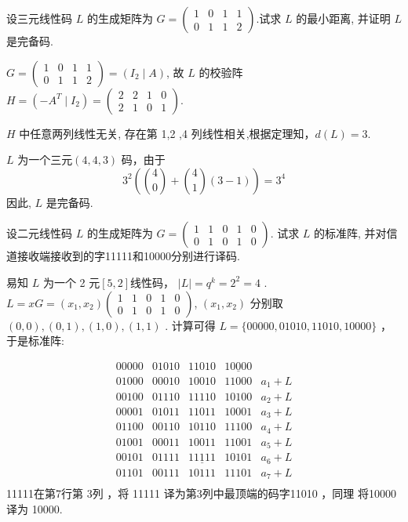 \newpage
 \begin{tcolorbox}[breakable,colback=blue!5!white,colframe=blue!75!black,
 title= 解答题]
设三元线性码 $ L $ 的生成矩阵为
$
G=\left(\begin{array}{llll}
1 & 0 & 1 & 1 \\
0 & 1 & 1 & 2
\end{array}\right)
$.试求 $ L $ 的最小距离, 并证明 $ L $ 是完备码.

\tcblower
 $ G=\left(\begin{array}{ll|ll}1 & 0 & 1 & 1 \\ 0 & 1 & 1 & 2\end{array}\right)=\left(I_{2} \mid A\right) $, 故 $ L $ 的校验阵 $H= \left(-A^{T} \mid I_{2}\right)=\left(\begin{array}{llll}2 & 2 & 1 & 0 \\ 2 & 1 & 0 & 1\end{array}\right)$. 

$ H $ 中任意两列线性无关, 存在第 1,2 ,4 列线性相关,根据定理知，$d(L)=3$. 

$L$ 为一个三元$(4,4,3)$ 码，由于
$$
3^{2}\left(\binom{4}{0}+\binom{4}{1}(3-1)\right)=3^{4}
$$
因此, $ L $ 是完备码.
\end{tcolorbox}


 \begin{tcolorbox}[breakable,colback=blue!5!white,colframe=blue!75!black,
 title= 解答题]

设二元线性码 $ L $ 的生成矩阵为
$
G=\left(\begin{array}{lllll}
1 & 1 & 0 & 1 & 0 \\
0 & 1 & 0 & 1 & 0
\end{array}\right) .
$
试求 $ L $ 的标准阵, 并对信道接收端接收到的字11111和10000分别进行译码.
\tcblower

易知 $L$  为一个 2 元$[5,2]$线性码， $|L|=q^{k}=2^{2}=4$ .
$L=x G=\left(x_{1}, x_{2}\right)\left(\begin{array}{lllll}
1 & 1 & 0 & 1 & 0 \\
0 & 1 & 0 & 1 & 0
\end{array}\right)$,
$(x_{1}, x_{2})$ 分别取$(0,0),(0,1),(1,0),(1,1)$ . 计算可得 $L=\{00000,01010,11010,10000\}$ ， 于是标准阵: 

$$
\begin{array}{lllll}
00000 & 01010 & 11010 & \underline{10000}  &\\
01000 & 00010 & 10010 & 11000 & a_{1}+L  \\
00100 & 01110 & 11110 & 10100 & a_{2}+L \\
00001 & 01011 & 11011 & 10001 & a_{3}+L \\
01100 & 00110 & 10110 & 11100 & a_{4}+L \\
01001 & 00011 & 10011 & 11001 & a_{5}+L \\
00101 & 01111 & \underline{11111} & 10101 & a_{6}+L \\
01101 & 00111 & 10111 & 11101 & a_{7}+L \\
\end{array} 
$$
11111在第7行第 3列 ，将 11111 译为第3列中最顶端的码字11010 ，同理 将10000 译为 10000.
\end{tcolorbox}


